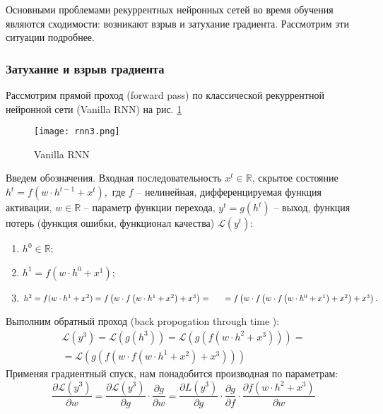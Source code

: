 \bigskip\par
Основными проблемами рекуррентных нейронных сетей во время обучения являются сходимости: возникают взрыв и затухание градиента. Рассмотрим эти ситуации подробнее.
\subsubsection{Затухание и взрыв градиента}
Рассмотрим прямой проход (forward pass) по классической рекуррентной нейронной сети (Vanilla RNN) на рис. \ref{fig:rnn3} 
\begin{figure}[ht]
    \centering
    \texttt{[image: rnn3.png]}
    \caption{Vanilla RNN}
    \label{fig:rnn3}
\end{figure}

Введем обозначения. Входная последовательность $x^{t} \in \mathbb{R}$, скрытое состояние $h^{t} = f(w\cdot h^{t-1} + x^{t}),$ где $f$ -- нелинейная, дифференцируемая функция активации, $w \in \mathbb{R}$ -- параметр функции перехода, $y^{t} = g(h^{t})$ -- выход, функция потерь (функция ошибки, функционал качества) $\mathcal{L}(y^{t})$:
\begin{enumerate}
    \item $h^{0} \in \mathbb{R}$;
    \item $h^{1} = f(w\cdot h^{0} + x^1)$;
    \item $h^{2} = f(w\cdot h^{1} + x^{2}) = f\left(w \cdot f \left(w \cdot h^{1} + x^{2}\right) + x^{3}\right) = \\\hspace{0.5cm}=f\left(w \cdot f\left(w \cdot f\left(w \cdot h^{0} + x^{1}\right) + x^{2}\right) + x^{3}\right).$
\end{enumerate}
Выполним обратный проход (back propogation through time \cite{Zipser:1}):
\begin{gather*}
\mathcal{L} (y^{3}) = \mathcal{L} \left(g\left(h^{3}\right)\right) = \mathcal{L}\left(g\left(f\left(w\cdot h^{2} + x^{3}\right)\right)\right) = \\ = \mathcal{L}\left(g\left(f\left(w\cdot f\left(w\cdot h^{1} + x^{2}\right) + x^{3}\right)\right)\right)    
\end{gather*}
Применяя градиентный спуск, нам понадобится производная по параметрам:
\[\frac{\partial \mathcal{L}\left(y^{3}\right)}{\partial w} = \frac{\partial \mathcal{L}\left(y^{3}\right)}{\partial g}\cdot \frac{\partial g}{\partial w} = \frac{\partial \mathcal{}{L}\left(y^{3}\right)}{\partial g} \cdot \frac{\partial g}{\partial f}\cdot \frac{\partial f\left(w\cdot h^{2} + x^{3}\right)}{\partial w}\]
